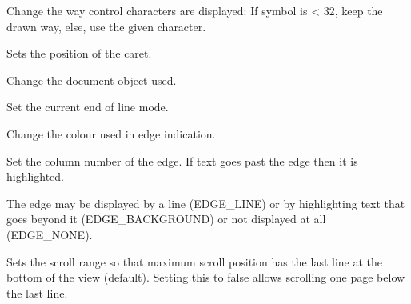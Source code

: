 
Change the way control characters are displayed:
If symbol is < 32, keep the drawn way, else, use the given character.


\label{wxstyledtextctrlsetcurrentpos}


Sets the position of the caret.


\label{wxstyledtextctrlsetdocpointer}


Change the document object used.


\label{wxstyledtextctrlseteolmode}


Set the current end of line mode.


\label{wxstyledtextctrlsetedgecolour}


Change the colour used in edge indication.


\label{wxstyledtextctrlsetedgecolumn}


Set the column number of the edge.
If text goes past the edge then it is highlighted.


\label{wxstyledtextctrlsetedgemode}


The edge may be displayed by a line (EDGE\_LINE) or by highlighting text that
goes beyond it (EDGE\_BACKGROUND) or not displayed at all (EDGE\_NONE).


\label{wxstyledtextctrlsetendatlastline}


Sets the scroll range so that maximum scroll position has
the last line at the bottom of the view (default).
Setting this to false allows scrolling one page below the last line.


